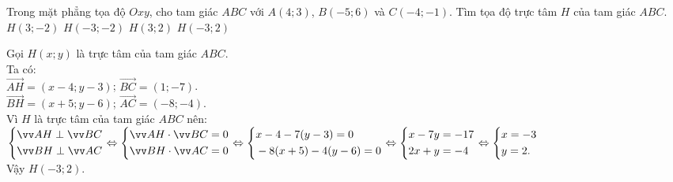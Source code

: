 \begin{ex}%
 Trong mặt phẳng tọa độ $Oxy$, cho tam giác $ABC$ với $A(4;3)$, $B(-5;6)$ và $C(-4;-1)$. Tìm tọa độ trực tâm $H$ của tam giác $ABC$.
 \choice
  {$H(3;-2)$}
  {$H(-3;-2)$}
  {$H(3;2)$}
  {\True $H(-3;2)$}
 \loigiai
 {
 \begin{center}
 \end{center}
 Gọi $H(x;y)$ là trực tâm của tam giác $ABC$.\\
 Ta có:\\
 $\vec{AH} = (x-4;y-3)$; $\vec{BC} = (1;-7)$.\\
 $\vec{BH} = (x+5;y-6)$; $\vec{AC} = (-8;-4)$.\\
 Vì $H$ là trực tâm của tam giác $ABC$ nên:\\
 $\heva{& \vec{AH} \perp \vec{BC} \\& \vec{BH} \perp \vec{AC}} \Leftrightarrow \heva{& \vec{AH} \cdot \vec{BC} = 0 \\& \vec{BH} \cdot \vec{AC} = 0} \Leftrightarrow \heva{& x-4-7(y-3)=0 \\& -8(x+5)-4(y-6)=0} \Leftrightarrow \heva{& x-7y=-17 \\& 2x+y=-4} \Leftrightarrow \heva{& x=-3 \\& y=2.}$\\
 Vậy $H(-3;2)$.
 }
\end{ex}


